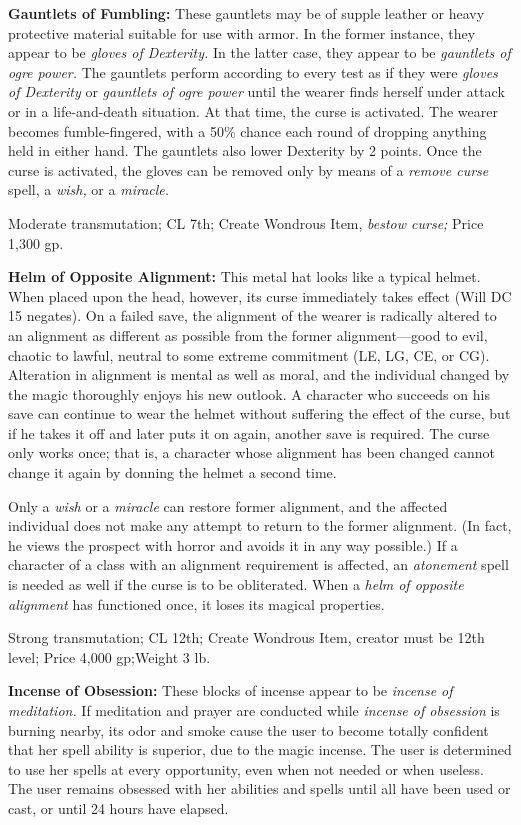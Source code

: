 \textbf{Gauntlets of Fumbling:} These gauntlets may be of supple leather or heavy 
protective material suitable for use with armor. In the former instance, they appear 
to be \textit{gloves of Dexterity. }In the latter case, they appear to be \textit{gauntlets 
of ogre power. }The gauntlets perform according to every test as if they were \textit{gloves 
of Dexterity }or \textit{gauntlets of ogre power }until the wearer finds herself 
under attack or in a life-and-death situation. At that time, the curse is activated. 
The wearer becomes fumble-fingered, with a 50\% chance each round of dropping anything 
held in either hand. The gauntlets also lower Dexterity by 2 points. Once the curse 
is activated, the gloves can be removed only by means of a \textit{remove curse 
}spell, a \textit{wish, }or a \textit{miracle.}

Moderate transmutation; CL 7th; Create Wondrous Item, \textit{bestow curse; }Price 
1,300 gp.

\textbf{Helm of Opposite Alignment:} This metal hat looks like a typical helmet. 
When placed upon the head, however, its curse immediately takes effect (Will DC 
15 negates). On a failed save, the alignment of the wearer is radically altered 
to an alignment as different as possible from the former alignment---good to evil, 
chaotic to lawful, neutral to some extreme commitment (LE, LG, CE, or CG). Alteration 
in alignment is mental as well as moral, and the individual changed by the magic 
thoroughly enjoys his new outlook. A character who succeeds on his save can continue 
to wear the helmet without suffering the effect of the curse, but if he takes it 
off and later puts it on again, another save is required. The curse only works 
once; that is, a character whose alignment has been changed cannot change it again 
by donning the helmet a second time.

Only a \textit{wish }or a \textit{miracle }can restore former alignment, and the 
affected individual does not make any attempt to return to the former alignment. 
(In fact, he views the prospect with horror and avoids it in any way possible.) 
If a character of a class with an alignment requirement is affected, an \textit{atonement 
}spell is needed as well if the curse is to be obliterated. When a \textit{helm 
of opposite alignment }has functioned once, it loses its magical properties.

Strong transmutation; CL 12th; Create Wondrous Item, creator must be 12th level; 
Price 4,000 gp;Weight 3 lb.

\textbf{Incense of Obsession:} These blocks of incense appear to be \textit{incense 
of meditation. }If meditation and prayer are conducted while \textit{incense of 
obsession }is burning nearby, its odor and smoke cause the user to become totally 
confident that her spell ability is superior, due to the magic incense. The user 
is determined to use her spells at every opportunity, even when not needed or when 
useless. The user remains obsessed with her abilities and spells until all have 
been used or cast, or until 24 hours have elapsed.

